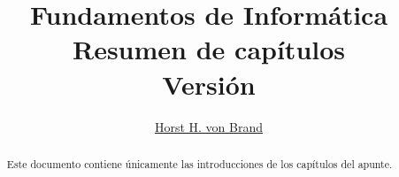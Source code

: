 \documentclass[czech, english, german, french, latin, romanian, spanish, fleqn]{article}
\title{Fundamentos de Informática\\
       Resumen de capítulos\\[0.5\baselineskip]
       \normalsize{Versión \classversion}}
\author{\href{mailto:vonbrand@inf.utfsm.cl}{Horst H. von Brand}}
\begin{document}

\maketitle
\thispagestyle{empty}
\begin{abstract}
  Este documento contiene únicamente las introducciones
  de los capítulos del apunte.
\end{abstract}
\end{document}
